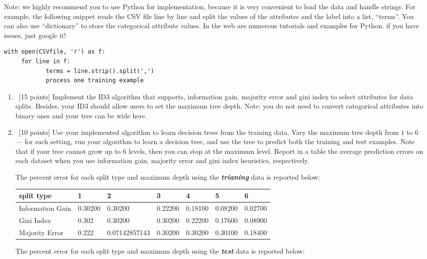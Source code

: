 \documentclass[12pt, fullpage,letterpaper]{article}
\begin{document}
\begin{enumerate}
\noindent Note: we highly recommend you to use Python for implementation, because it is very convenient to load the data and handle strings. For example, the following snippet reads the CSV file line by line and split the values of the attributes and the label into a list, ``terms''. You can also use ``dictionary'' to store the categorical attribute values. In the web are numerous tutorials and examples for Python. if you have issues, just google it!
\begin{lstlisting}
with open(CSVfile, 'r') as f:
     for line in f:
            terms = line.strip().split(',')
            process one training example
\end{lstlisting}
\begin{enumerate}
\item~[15 points] Implement the ID3 algorithm that supports, information gain,  majority error and gini index to select attributes for data splits. Besides, your ID3 should allow users to set the maximum tree depth. Note: you do not need to convert categorical attributes into binary ones and your tree can be wide here. 
\item~[10 points] Use your implemented algorithm to learn decision trees from the training data. Vary the maximum  tree depth from $1$ to $6$  --- for each setting, run your algorithm to learn a decision tree, and use the tree to  predict both the training  and test examples. Note that if your tree cannot grow up to 6 levels, then you can stop at the maximum level. Report in a table the average prediction errors on each dataset when you use information gain, majority error and gini index heuristics, respectively.

The percent error for each split type and maximum depth using the \emph\textbf{trianing} data is reported below:

\begin{tabular}{|l|l|l|l|l|l|l|}
	\hline
	split type       & 1       & 2             & 3       & 4       & 5       & 6       \\ \hline
	Information Gain & 0.30200 & 0.30200       & 0.22200 & 0.18100 & 0.08200 & 0.02700 \\ \hline
	Gini Index       & 0.302   & 0.30200       & 0.30200 & 0.22200 & 0.17600 & 0.08900 \\ \hline
	Majority Error   & 0.222   & 0.07142857143 & 0.30200 & 0.30200 & 0.30100 & 0.18400 \\ \hline
	\end{tabular}

The percent error for each split type and maximum depth using the \emph\textbf{test} data is reported below:


\end{enumerate}
\end{enumerate}
\end{document}
